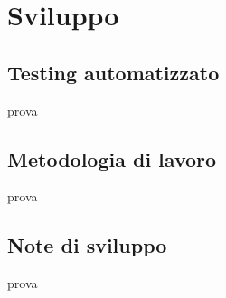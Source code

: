 \section{Sviluppo}
\subsection{Testing automatizzato}
prova
\subsection{Metodologia di lavoro}
prova
\subsection{Note di sviluppo}
prova